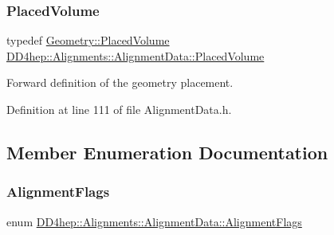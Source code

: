 \hypertarget{class_d_d4hep_1_1_alignments_1_1_alignment_data_aab2d43f5a4a4c2163e0a04905306525a}{}\label{class_d_d4hep_1_1_alignments_1_1_alignment_data_aab2d43f5a4a4c2163e0a04905306525a} 
\subsubsection{\texorpdfstring{Placed\+Volume}{PlacedVolume}}
{\footnotesize\ttfamily typedef \hyperlink{class_d_d4hep_1_1_geometry_1_1_placed_volume}{Geometry\+::\+Placed\+Volume} \hyperlink{class_d_d4hep_1_1_alignments_1_1_alignment_data_aab2d43f5a4a4c2163e0a04905306525a}{D\+D4hep\+::\+Alignments\+::\+Alignment\+Data\+::\+Placed\+Volume}}



Forward definition of the geometry placement. 



Definition at line 111 of file Alignment\+Data.\+h.



\subsection{Member Enumeration Documentation}
\hypertarget{class_d_d4hep_1_1_alignments_1_1_alignment_data_a3fb06356abe173269ebc8fd920758357}{}\label{class_d_d4hep_1_1_alignments_1_1_alignment_data_a3fb06356abe173269ebc8fd920758357} 
\subsubsection{\texorpdfstring{Alignment\+Flags}{AlignmentFlags}}
{\footnotesize\ttfamily enum \hyperlink{class_d_d4hep_1_1_alignments_1_1_alignment_data_a3fb06356abe173269ebc8fd920758357}{D\+D4hep\+::\+Alignments\+::\+Alignment\+Data\+::\+Alignment\+Flags}}

